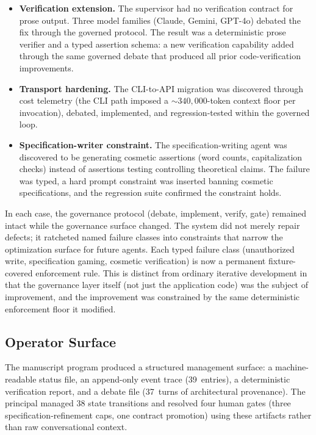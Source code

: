 \documentclass[11pt]{article}
\begin{document}
\begin{itemize}[nosep]
\item \textbf{Verification extension.} The supervisor had no verification contract for prose output. Three model families (Claude, Gemini, GPT-4o) debated the fix through the governed protocol. The result was a deterministic prose verifier and a typed assertion schema: a new verification capability added through the same governed debate that produced all prior code-verification improvements.
\item \textbf{Transport hardening.} The CLI-to-API migration was discovered through cost telemetry (the CLI path imposed a ${\sim}340{,}000$-token context floor per invocation), debated, implemented, and regression-tested within the governed loop.
\item \textbf{Specification-writer constraint.} The specification-writing agent was discovered to be generating cosmetic assertions (word counts, capitalization checks) instead of assertions testing controlling theoretical claims. The failure was typed, a hard prompt constraint was inserted banning cosmetic specifications, and the regression suite confirmed the constraint holds.
\end{itemize}

In each case, the governance protocol (debate, implement, verify, gate) remained intact while the governance surface changed. The system did not merely repair defects; it ratcheted named failure classes into constraints that narrow the optimization surface for future agents. Each typed failure class (unauthorized write, specification gaming, cosmetic verification) is now a permanent fixture-covered enforcement rule. This is distinct from ordinary iterative development in that the governance layer itself (not just the application code) was the subject of improvement, and the improvement was constrained by the same deterministic enforcement floor it modified.

\subsection{Operator Surface}

The manuscript program produced a structured management surface: a machine-readable status file, an append-only event trace (39~entries), a deterministic verification report, and a debate file (37~turns of architectural provenance). The principal managed 38 state transitions and resolved four human gates (three specification-refinement caps, one contract promotion) using these artifacts rather than raw conversational context.
\end{document}

